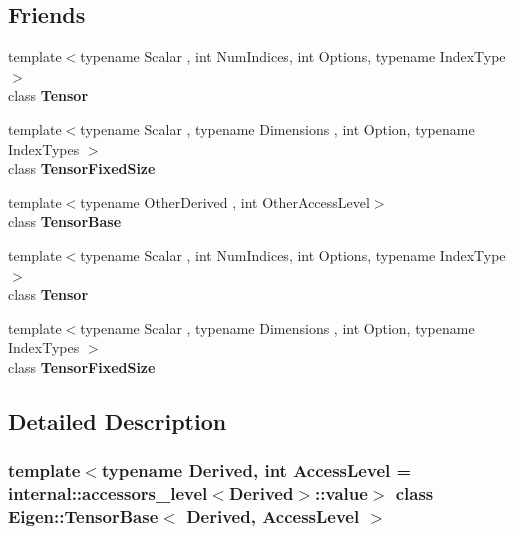 \subsection*{Friends}
\begin{DoxyCompactItemize}
\item 
\mbox{\label{class_eigen_1_1_tensor_base_a52ec8fedf7f21586c4dd55da03b8d8de}} 
{\footnotesize template$<$typename Scalar , int Num\+Indices, int Options, typename Index\+Type $>$ }\\class {\bfseries Tensor}
\item 
\mbox{\label{class_eigen_1_1_tensor_base_abf429f77a188e13e320147a061c51df1}} 
{\footnotesize template$<$typename Scalar , typename Dimensions , int Option, typename Index\+Types $>$ }\\class {\bfseries Tensor\+Fixed\+Size}
\item 
\mbox{\label{class_eigen_1_1_tensor_base_a3574ea5c818fe3a123bccc1e5474d705}} 
{\footnotesize template$<$typename Other\+Derived , int Other\+Access\+Level$>$ }\\class {\bfseries Tensor\+Base}
\item 
\mbox{\label{class_eigen_1_1_tensor_base_ad1945ad54713b8f3899a91229b6ab14f}} 
{\footnotesize template$<$typename Scalar , int Num\+Indices, int Options, typename Index\+Type $>$ }\\class {\bfseries Tensor}
\item 
\mbox{\label{class_eigen_1_1_tensor_base_af0e7bc83af1d822a3aa5fc25b22315e3}} 
{\footnotesize template$<$typename Scalar , typename Dimensions , int Option, typename Index\+Types $>$ }\\class {\bfseries Tensor\+Fixed\+Size}
\end{DoxyCompactItemize}


\subsection{Detailed Description}
\subsubsection*{template$<$typename Derived, int Access\+Level = internal\+::accessors\+\_\+level$<$\+Derived$>$\+::value$>$\newline
class Eigen\+::\+Tensor\+Base$<$ Derived, Access\+Level $>$}

